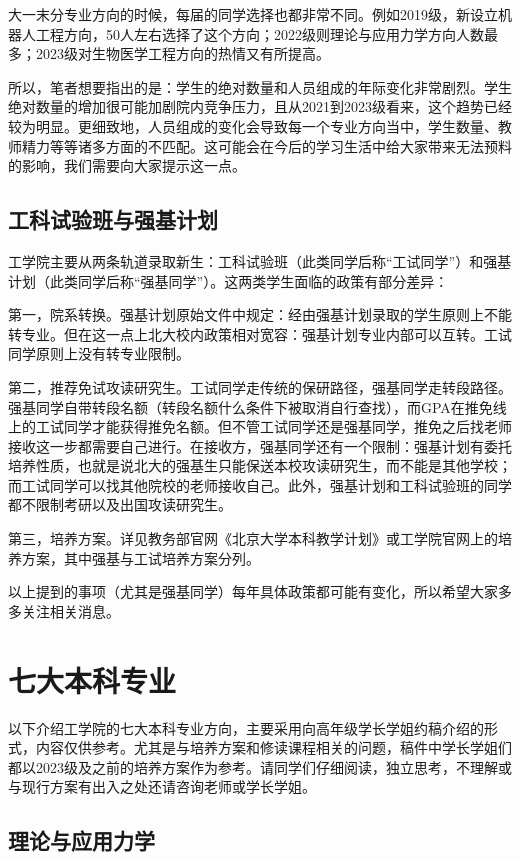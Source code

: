 \documentclass[11pt,oneside]{book}
\begin{document}
大一末分专业方向的时候，每届的同学选择也都非常不同。例如2019级，新设立机器人工程方向，50人左右选择了这个方向；2022级则理论与应用力学方向人数最多；2023级对生物医学工程方向的热情又有所提高。

所以，笔者想要指出的是：学生的绝对数量和人员组成的年际变化非常剧烈。学生绝对数量的增加很可能加剧院内竞争压力，且从2021到2023级看来，这个趋势已经较为明显。更细致地，人员组成的变化会导致每一个专业方向当中，学生数量、教师精力等等诸多方面的不匹配。这可能会在今后的学习生活中给大家带来无法预料的影响，我们需要向大家提示这一点。
        
\subsection{工科试验班与强基计划}
工学院主要从两条轨道录取新生：工科试验班（此类同学后称“工试同学”）和强基计划（此类同学后称“强基同学”）。这两类学生面临的政策有部分差异：

第一，院系转换。强基计划原始文件中规定：经由强基计划录取的学生原则上不能转专业。但在这一点上北大校内政策相对宽容：强基计划专业内部可以互转。工试同学原则上没有转专业限制。

第二，推荐免试攻读研究生。工试同学走传统的保研路径，强基同学走转段路径。强基同学自带转段名额（转段名额什么条件下被取消自行查找），而GPA在推免线上的工试同学才能获得推免名额。但不管工试同学还是强基同学，推免之后找老师接收这一步都需要自己进行。在接收方，强基同学还有一个限制：强基计划有委托培养性质，也就是说北大的强基生只能保送本校攻读研究生，而不能是其他学校；而工试同学可以找其他院校的老师接收自己。此外，强基计划和工科试验班的同学都不限制考研以及出国攻读研究生。

第三，培养方案。详见教务部官网《北京大学本科教学计划》或工学院官网上的培养方案，其中强基与工试培养方案分列。

以上提到的事项（尤其是强基同学）每年具体政策都可能有变化，所以希望大家多多关注相关消息。

 
\section{七大本科专业}
以下介绍工学院的七大本科专业方向，主要采用向高年级学长学姐约稿介绍的形式，内容仅供参考。尤其是与培养方案和修读课程相关的问题，稿件中学长学姐们都以2023级及之前的培养方案作为参考。请同学们仔细阅读，独立思考，不理解或与现行方案有出入之处还请咨询老师或学长学姐。
\subsection{理论与应用力学}
\end{document}
